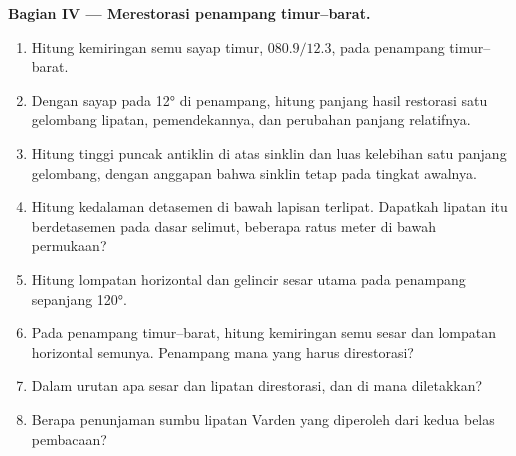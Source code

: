 \begin{problem}
\medskip\noindent\textbf{Bagian IV --- Merestorasi penampang timur--barat.}
\begin{enumerate}[resume]
  \item Hitung kemiringan semu sayap timur, $080.9/12.3$, pada
        penampang timur--barat.
  \item Dengan sayap pada \ang{12} di penampang, hitung panjang hasil restorasi
        satu gelombang lipatan, pemendekannya, dan perubahan
        panjang relatifnya.
  \item Hitung tinggi puncak antiklin di atas sinklin dan
        luas kelebihan satu panjang gelombang, dengan anggapan bahwa sinklin
        tetap pada tingkat awalnya.
  \item Hitung kedalaman detasemen di bawah lapisan terlipat. Dapatkah
        lipatan itu berdetasemen pada dasar selimut, beberapa ratus meter
        di bawah permukaan?
  \item Hitung lompatan horizontal dan gelincir sesar utama pada
        penampang sepanjang \ang{120}.
  \item Pada penampang timur--barat, hitung kemiringan semu sesar dan
        lompatan horizontal semunya. Penampang mana yang harus direstorasi?
  \item Dalam urutan apa sesar dan lipatan direstorasi, dan di mana
         diletakkan?
  \item Berapa penunjaman sumbu lipatan Varden yang diperoleh dari kedua belas
        pembacaan?
\end{enumerate}
\end{problem}
